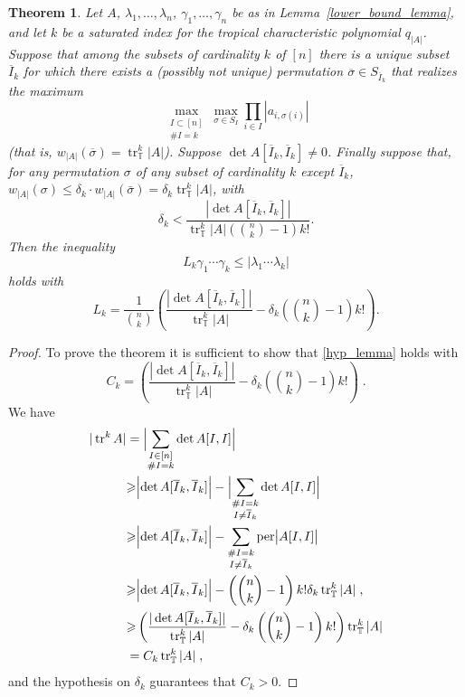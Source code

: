 \documentclass[a4paper]{amsart}
\theoremstyle{definition}
\theoremstyle{plain}
\newtheorem{thm}{Theorem}
\theoremstyle{remark}
\begin{document}
\begin{thm} \label{lower_bound}
 Let $A$, $\lambda_1,\dots,\lambda_n$, $\gamma_1,\dots,\gamma_n$ be as
in Lemma~\ref{lower_bound_lemma}, and let $k$ be a saturated index
 for the tropical characteristic polynomial $q_{|A|}$.
 Suppose that among the subsets of cardinality $k$ of 
$[n]$
there is a unique subset $\overline{I}_k$
 for which there exists a (possibly not unique) permutation $\overline{\sigma}\in S_{\overline{I}_k}$
 that realizes the maximum
 \begin{equation} \label{max_perm_weight}
  \max_{\substack{I\subset [n]\\{\# {I}}=k}} \max_{\sigma \in S_I} \prod_{i \in I} |a_{i,\sigma(i)}|
 \end{equation}
 (that is, $w_{|A|}(\overline{\sigma})=\operatorname{tr}^k_{{\mathbb{T}}}|A|$).
 Suppose $\det A[\overline{I}_k,\overline{I}_k] \neq 0$.
 Finally suppose that, for any permutation $\sigma$ of any subset of cardinality $k$ except $\overline{I}_k$,
 $w_{|A|}(\sigma){\leqslant}\delta_k\cdot w_{|A|}(\bar{\sigma})=\delta_k\operatorname{tr}^k_{{\mathbb{T}}}|A|$, with
 \[
  \delta_k < \frac{|\det A[\overline{I}_k,\overline{I}_k]|}{\operatorname{tr}^k_{{\mathbb{T}}}|A|\left(\binom{n}{k}-1\right)k!}.
 \]
 Then the inequality
 \[
  L_k\gamma_1\dotsm\gamma_k{\leqslant}|\lambda_1\dotsm\lambda_k|
 \]
 holds with
 \[
  L_k = \frac{1}{\binom{n}{k}}\left(\frac{|\det A[\overline{I}_k,\overline{I}_k]|}
  {\operatorname{tr}^k_{{\mathbb{T}}}|A|} - \delta_k\mbox{$\left(\binom{n}{k}-1\right)k!$} \right).
 \]
\end{thm}
\begin{proof}
To prove the theorem it is sufficient to show that \eqref{hyp_lemma} holds with 
\[ 
C_k = \left( \frac{|\det A[\overline{I}_k,\overline{I}_k]|}{\operatorname{tr}^k_{{\mathbb{T}}}|A|}
- \delta_k \left(\binom{n}{k}-1\right)k! \right) \; .
\]
We have
\begin{align*}
|\operatorname{tr}^k A| &= \Bigl|\sum_{\substack{I\in[n]\\{\# {I}}=k}}\det A[I,I]\Bigr|\\
&{\geqslant} \Bigl|\det A[\overline{I}_k,\overline{I}_k]\Bigr|-\Bigl|\sum_{\substack{{\# {I}}=k\\I\neq\overline{I}_k}}\det A[I,I]\Bigr|\\
&{\geqslant} \Bigl|\det A[\overline{I}_k,\overline{I}_k]\Bigr|-\sum_{\substack{{\# {I}}=k\\I\neq\overline{I}_k}}\operatorname{per} \bigl|A[I,I]\bigr|\\
&{\geqslant} \Bigl|\det A[\overline{I}_k,\overline{I}_k]\Bigr|-\left(\binom{n}{k}-1\right) k! \delta_k\operatorname{tr}^k_{{\mathbb{T}}}|A| \; ,\\
&{\geqslant} \left(\frac{|\det A[\overline{I}_k,\overline{I}_k]|}{\operatorname{tr}^k_{{\mathbb{T}}}|A|} - \delta_k\left(\binom{n}{k}-1\right)k! \right)
\operatorname{tr}^k_{{\mathbb{T}}}|A|\\
&=C_k\operatorname{tr}^k_{{\mathbb{T}}}|A|\; ,
\end{align*}
and the hypothesis on $\delta_k$ guarantees that $C_k > 0$.
\end{proof}
\end{document}
